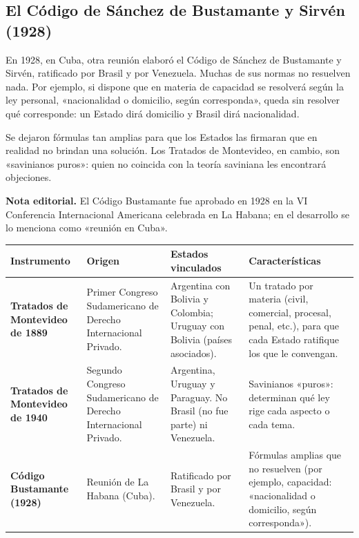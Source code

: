 \documentclass[12pt,oneside]{book}
\begin{document}
\subsection{El Código de Sánchez de Bustamante y Sirvén (1928)}

En 1928, en Cuba, otra reunión elaboró el Código de Sánchez de Bustamante y Sirvén, ratificado por Brasil y por Venezuela. Muchas de sus normas no resuelven nada. Por ejemplo, si dispone que en materia de capacidad se resolverá según la ley personal, «nacionalidad o domicilio, según corresponda», queda sin resolver qué corresponde: un Estado dirá domicilio y Brasil dirá nacionalidad.

Se dejaron fórmulas tan amplias para que los Estados las firmaran que en realidad no brindan una solución. Los Tratados de Montevideo, en cambio, son «savinianos puros»: quien no coincida con la teoría saviniana les encontrará objeciones.

\begin{note}
\textbf{Nota editorial.} El Código Bustamante fue aprobado en 1928 en la VI Conferencia Internacional Americana celebrada en La Habana; en el desarrollo se lo menciona como «reunión en Cuba».
\end{note}

\begin{table}[H]
\centering
\footnotesize
\setlength{\tabcolsep}{4pt}
\begin{tabular}{@{}L{0.17\textwidth}L{0.20\textwidth}L{0.26\textwidth}L{0.27\textwidth}@{}}
\toprule
\textbf{Instrumento} & \textbf{Origen} & \textbf{Estados vinculados} & \textbf{Características} \\
\midrule
\textbf{Tratados de Montevideo de 1889} & Primer Congreso Sudamericano de Derecho Internacional Privado. & Argentina con Bolivia y Colombia; Uruguay con Bolivia (países asociados). & Un tratado por materia (civil, comercial, procesal, penal, etc.), para que cada Estado ratifique los que le convengan. \\
\addlinespace
\textbf{Tratados de Montevideo de 1940} & Segundo Congreso Sudamericano de Derecho Internacional Privado. & Argentina, Uruguay y Paraguay. No Brasil (no fue parte) ni Venezuela. & Savinianos «puros»: determinan qué ley rige cada aspecto o cada tema. \\
\addlinespace
\textbf{Código Bustamante (1928)} & Reunión de La Habana (Cuba). & Ratificado por Brasil y por Venezuela. & Fórmulas amplias que no resuelven (por ejemplo, capacidad: «nacionalidad o domicilio, según corresponda»). \\
\bottomrule
\end{tabular}
\end{table}
\end{document}
